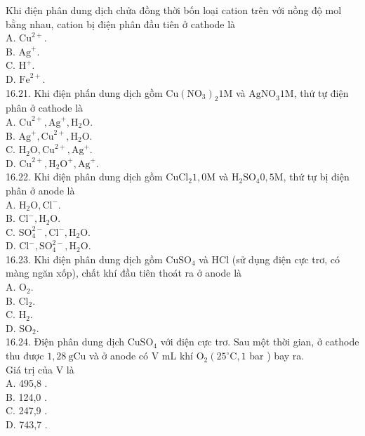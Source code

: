 \documentclass[10pt]{article}
\begin{document}
Khi điện phân dung dịch chửa đồng thời bốn loại cation trên với nồng độ mol bằng nhau, cation bị điện phân đầu tiên ở cathode là\\
A. $\mathrm{Cu}^{2+}$.\\
B. $\mathrm{Ag}^{+}$.\\
C. $\mathrm{H}^{+}$.\\
D. $\mathrm{Fe}^{2+}$.\\
16.21. Khi điện phấn dung dịch gồm $\mathrm{Cu}\left(\mathrm{NO}_{3}\right)_{2} 1 \mathrm{M}$ và $\mathrm{AgNO}_{3} 1 \mathrm{M}$, thứ tự điện phân ở cathode là\\
A. $\mathrm{Cu}^{2+}, \mathrm{Ag}^{+}, \mathrm{H}_{2} \mathrm{O}$.\\
B. $\mathrm{Ag}^{+}, \mathrm{Cu}^{2+}, \mathrm{H}_{2} \mathrm{O}$.\\
C. $\mathrm{H}_{2} \mathrm{O}, \mathrm{Cu}^{2+}, \mathrm{Ag}^{+}$.\\
D. $\mathrm{Cu}^{2+}, \mathrm{H}_{2} \mathrm{O}^{+}, \mathrm{Ag}^{+}$.\\
16.22. Khi điện phân dung dịch gồm $\mathrm{CuCl}_{2} 1,0 \mathrm{M}$ và $\mathrm{H}_{2} \mathrm{SO}_{4} 0,5 \mathrm{M}$, thứ tự bị điện phân ở anode là\\
A. $\mathrm{H}_{2} \mathrm{O}, \mathrm{Cl}^{-}$.\\
B. $\mathrm{Cl}^{-}, \mathrm{H}_{2} \mathrm{O}$.\\
C. $\mathrm{SO}_{4}^{2-}, \mathrm{Cl}^{-}, \mathrm{H}_{2} \mathrm{O}$.\\
D. $\mathrm{Cl}^{-}, \mathrm{SO}_{4}^{2-}, \mathrm{H}_{2} \mathrm{O}$.\\
16.23. Khi điện phân dung dịch gồm $\mathrm{CuSO}_{4}$ và HCl (sử dụng điện cực trơ, có màng ngăn xốp), chất khí đầu tiên thoát ra ở anode là\\
A. $\mathrm{O}_{2}$.\\
B. $\mathrm{Cl}_{2}$.\\
C. $\mathrm{H}_{2}$.\\
D. $\mathrm{SO}_{2}$.\\
16.24. Điện phân dung dịch $\mathrm{CuSO}_{4}$ với điện cực trơ. Sau một thời gian, ở cathode thu được $1,28 \mathrm{~g} \mathrm{Cu}$ và ở anode có V mL khí $\mathrm{O}_{2}\left(25^{\circ} \mathrm{C}, 1\right.$ bar ) bay ra.\\
Giá trị của V là\\
A. 495,8 .\\
B. 124,0 .\\
C. 247,9 .\\
D. 743,7 .
\end{document}
